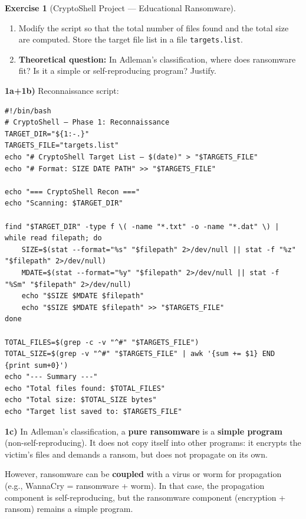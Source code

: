 \documentclass[a4paper,11pt]{article}
\theoremstyle{plain}
\theoremstyle{definition}
\newtheorem{exercice}{Exercise}
\begin{document}
\begin{exercice}[CryptoShell Project --- Educational Ransomware]
\begin{enumerate}
\item[\textbf{1b)}] Modify the script so that the total number of files found and the total size are computed. Store the target file list in a file \texttt{targets.list}.

\item[\textbf{1c)}] \textbf{Theoretical question:} In Adleman's classification, where does ransomware fit? Is it a simple or self-reproducing program? Justify.
\end{enumerate}

\begin{correction}

\textbf{1a+1b)} Reconnaissance script:
\begin{lstlisting}[title=recon.sh (phase1\_recon.sh)]
#!/bin/bash
# CryptoShell — Phase 1: Reconnaissance
TARGET_DIR="${1:-.}"
TARGETS_FILE="targets.list"
echo "# CryptoShell Target List — $(date)" > "$TARGETS_FILE"
echo "# Format: SIZE DATE PATH" >> "$TARGETS_FILE"

echo "=== CryptoShell Recon ==="
echo "Scanning: $TARGET_DIR"

find "$TARGET_DIR" -type f \( -name "*.txt" -o -name "*.dat" \) | while read filepath; do
    SIZE=$(stat --format="%s" "$filepath" 2>/dev/null || stat -f "%z" "$filepath" 2>/dev/null)
    MDATE=$(stat --format="%y" "$filepath" 2>/dev/null || stat -f "%Sm" "$filepath" 2>/dev/null)
    echo "$SIZE $MDATE $filepath"
    echo "$SIZE $MDATE $filepath" >> "$TARGETS_FILE"
done

TOTAL_FILES=$(grep -c -v "^#" "$TARGETS_FILE")
TOTAL_SIZE=$(grep -v "^#" "$TARGETS_FILE" | awk '{sum += $1} END {print sum+0}')
echo "--- Summary ---"
echo "Total files found: $TOTAL_FILES"
echo "Total size: $TOTAL_SIZE bytes"
echo "Target list saved to: $TARGETS_FILE"
\end{lstlisting}

\textbf{1c)} In Adleman's classification, a \textbf{pure ransomware} is a \textbf{simple program} (non-self-reproducing). It does not copy itself into other programs: it encrypts the victim's files and demands a ransom, but does not propagate on its own.

However, ransomware can be \textbf{coupled} with a virus or worm for propagation (e.g., WannaCry = ransomware + worm). In that case, the propagation component is self-reproducing, but the ransomware component (encryption + ransom) remains a simple program.


\end{correction}
\end{exercice}
\end{document}
